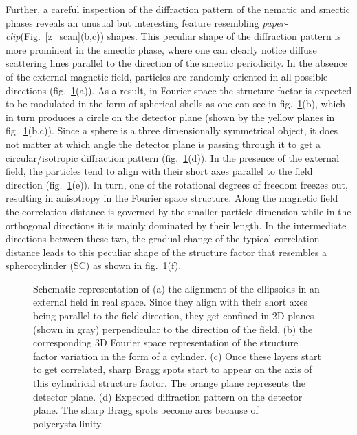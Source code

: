 \documentclass[aps,prl,preprint,superscriptaddress]{revtex4-1} %
\begin{document}
Further, a careful inspection of the diffraction pattern of the nematic and smectic phases reveals an unusual but interesting feature resembling \textit{paper-clip}(Fig.~\ref{z_scan}(b,c)) shapes. This peculiar shape of the diffraction pattern is more prominent in the smectic phase, where one can clearly notice diffuse scattering lines parallel to the direction of the smectic periodicity. In the absence of the external magnetic field, particles are randomly oriented in all possible directions (fig.~\ref{Fspace_smectic}(a)). As a result, in Fourier space the structure factor is expected to be modulated in the form of spherical shells as one can see in fig.~\ref{Fspace_smectic}(b), which in turn produces a circle on the detector plane (shown by the yellow planes in fig.~\ref{Fspace_smectic}(b,c)). Since a sphere is a three dimensionally symmetrical object, it does not matter at which angle the detector plane is passing through it to get a circular/isotropic diffraction pattern (fig.~\ref{Fspace_smectic}(d)). In the presence of the external field, the particles tend to align with their short axes parallel to the field direction (fig.~\ref{Fspace_smectic}(e)). In turn, one of the rotational degrees of freedom freezes out, resulting in anisotropy in the Fourier space structure. Along the magnetic field the correlation distance is governed by the smaller particle dimension while in the orthogonal directions it is mainly dominated by their length. In the intermediate directions between these two, the gradual change of the typical correlation distance leads to this peculiar shape of the structure factor that resembles a spherocylinder (SC) as shown in fig.~\ref{Fspace_smectic}(f). %
\begin{figure}[ht]
\caption{Schematic representation of (a) the alignment of the ellipsoids in an external field in real space. Since they align with their short axes being parallel to the field direction, they get confined in 2D planes (shown in gray) perpendicular to the direction of the field, (b) the corresponding 3D Fourier space representation of the structure factor variation in the form of a cylinder. (c) Once these layers start to get correlated, sharp Bragg spots start to appear on the axis of this cylindrical structure factor. The orange plane represents the detector plane. (d) Expected diffraction pattern on the detector plane. The sharp Bragg spots become arcs because of polycrystallinity.}\label{Fspace_smectic}
\end{figure} 
\end{document}
